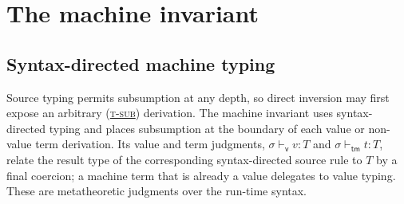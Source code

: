 \documentclass[acmsmall,screen,nonacm]{acmart}
\newcommand{\ruleref}[1]{%
  \textsc{(\hyperref[rule:#1]{#1})}}
\begin{document}
\section{The machine invariant}
\label{sec:invariant}

\subsection{Syntax-directed machine typing}

Source typing permits subsumption at any depth, so direct inversion may first
expose an arbitrary \ruleref{t-sub} derivation. The machine invariant uses
syntax-directed typing and places subsumption at the boundary of each value
or non-value term derivation. Its value and term judgments,
\(\sigma\vdash_{\mathsf v}v:T\) and
\(\sigma\vdash_{\mathsf{tm}}t:T\), relate the result type of the
corresponding syntax-directed source rule to \(T\) by a final coercion;
a machine term that is already a value delegates to value typing. These are
metatheoretic judgments over the run-time syntax.
\end{document}
